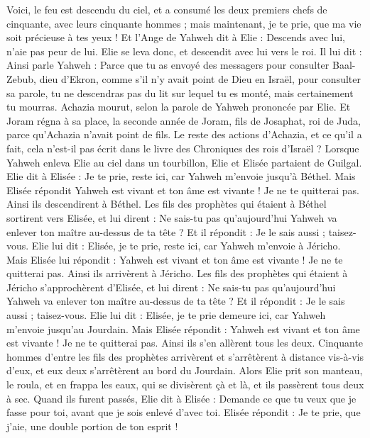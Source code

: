 \begin{multicols}{2}
Voici, le feu est descendu du ciel, et a consumé les deux premiers chefs de cinquante, avec leurs cinquante hommes ; mais maintenant, je te prie, que ma vie soit précieuse à tes yeux !
Et l’Ange de Yahweh dit à Elie : Descends avec lui, n’aie pas peur de lui. Elie se leva donc, et descendit avec lui vers le roi.
Il lui dit : Ainsi parle Yahweh : Parce que tu as envoyé des messagers pour consulter Baal-Zebub, dieu d’Ekron, comme s’il n’y avait point de Dieu en Israël, pour consulter sa parole, tu ne descendras pas du lit sur lequel tu es monté, mais certainement tu mourras.
Achazia mourut, selon la parole de Yahweh prononcée par Elie. Et Joram régna à sa place, la seconde année de Joram, fils de Josaphat, roi de Juda, parce qu’Achazia n’avait point de fils.
Le reste des actions d’Achazia, et ce qu’il a fait, cela n’est-il pas écrit dans le livre des Chroniques des rois d’Israël ?
\VerseOne{}Lorsque Yahweh enleva Elie au ciel dans un tourbillon, Elie et Elisée partaient de Guilgal.
Elie dit à Elisée : Je te prie, reste ici, car Yahweh m’envoie jusqu’à Béthel. Mais Elisée répondit Yahweh est vivant et ton âme est vivante ! Je ne te quitterai pas. Ainsi ils descendirent à Béthel.
Les fils des prophètes qui étaient à Béthel sortirent vers Elisée, et lui dirent : Ne sais-tu pas qu’aujourd’hui Yahweh va enlever ton maître au-dessus de ta tête ? Et il répondit : Je le sais aussi ; taisez-vous.
Elie lui dit : Elisée, je te prie, reste ici, car Yahweh m’envoie à Jéricho. Mais Elisée lui répondit : Yahweh est vivant et ton âme est vivante ! Je ne te quitterai pas. Ainsi ils arrivèrent à Jéricho.
Les fils des prophètes qui étaient à Jéricho s’approchèrent d’Elisée, et lui dirent : Ne sais-tu pas qu’aujourd’hui Yahweh va enlever ton maître au-dessus de ta tête ? Et il répondit : Je le sais aussi ; taisez-vous.
Elie lui dit : Elisée, je te prie demeure ici, car Yahweh m’envoie jusqu’au Jourdain. Mais Elisée répondit : Yahweh est vivant et ton âme est vivante ! Je ne te quitterai pas. Ainsi ils s’en allèrent tous les deux.
Cinquante hommes d’entre les fils des prophètes arrivèrent et s’arrêtèrent à distance vis-à-vis d’eux, et eux deux s’arrêtèrent au bord du Jourdain.
Alors Elie prit son manteau, le roula, et en frappa les eaux, qui se divisèrent çà et là, et ils passèrent tous deux à sec.
Quand ils furent passés, Elie dit à Elisée : Demande ce que tu veux que je fasse pour toi, avant que je sois enlevé d’avec toi. Elisée répondit : Je te prie, que j’aie, une double portion de ton esprit !

\end{multicols}
